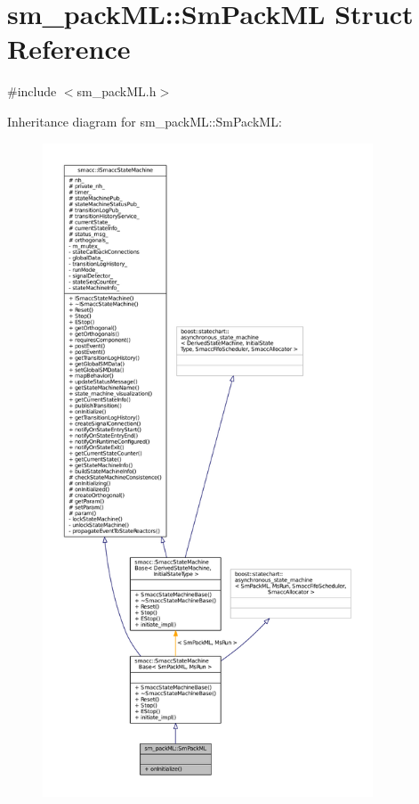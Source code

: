 \hypertarget{structsm__packML_1_1SmPackML}{}\section{sm\+\_\+pack\+ML\+:\+:Sm\+Pack\+ML Struct Reference}
\label{structsm__packML_1_1SmPackML}


{\ttfamily \#include $<$sm\+\_\+pack\+M\+L.\+h$>$}



Inheritance diagram for sm\+\_\+pack\+ML\+:\+:Sm\+Pack\+ML\+:
\nopagebreak
\begin{figure}[H]
\begin{center}
\leavevmode
\includegraphics[height=550pt]{structsm__packML_1_1SmPackML__inherit__graph}
\end{center}
\end{figure}


